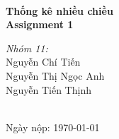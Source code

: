 \documentclass[a4paper,12pt]{article}
\title{
    \vspace{2in}
    \textbf{\Large \hmwkClass} \\[1em]
    \textmd{\LARGE \hmwkTitle} \\[2em]
    \vspace{2in}
}
\author{\hmwkAuthors}
\date{\hmwkDate}
\newcommand{\hmwkTitle}{Assignment 1}
\newcommand{\hmwkClass}{Thống kê nhiều chiều}
\newcommand{\hmwkAuthors}{
    Nguyễn Chí Tiến \\
    Nguyễn Thị Ngọc Anh \\
    Nguyễn Tiến Thịnh
}
\newcommand{\hmwkDate}{\today}
\begin{document}
\begin{titlepage}
    \centering
    \vspace*{3cm}
    {\Huge \textbf{\hmwkClass}}\\[1.5cm]
    {\LARGE \textbf{\hmwkTitle}}\\[1cm]
    \vspace{2cm}
    {\Large
    \textit{Nhóm 11:}\\[0.5cm]
    \hmwkAuthors
    }\\[3cm]
    {\Large Ngày nộp: \hmwkDate}\\
    \vfill
\end{titlepage}

\tableofcontents
\newpage










% 
\end{document}
